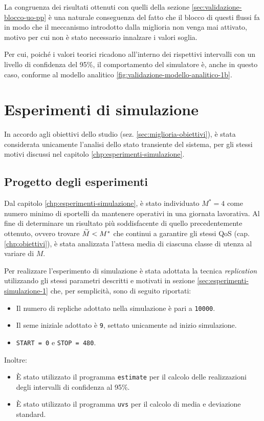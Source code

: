 La congruenza dei risultati ottenuti con quelli della sezione \ref{sec:validazione-blocco-uo-pp} è una naturale conseguenza del fatto che il blocco di questi flussi fa in modo che il meccanismo introdotto dalla miglioria non venga mai attivato, motivo per cui non è stato necessario innalzare i valori soglia.

Per cui, poiché i valori teorici ricadono all'interno dei rispettivi intervalli con un livello di confidenza del 95\%, il comportamento del simulatore è, anche in questo caso, conforme al modello analitico \ref{fig:validazione-modello-analitico-1b}.

\section{Esperimenti di simulazione}\label{sec:miglioria-esperimenti}
In accordo agli obiettivi dello studio (sez. \ref{sec:miglioria-obiettivi}), è stata considerata unicamente l'analisi dello stato transiente del sistema, per gli stessi motivi discussi nel capitolo \ref{chp:esperimenti-simulazione}.

\newpage
\subsection{Progetto degli esperimenti}
Dal capitolo \ref{chp:esperimenti-simulazione}, è stato individuato $M^* = 4$ come numero minimo di sportelli da mantenere operativi in una giornata lavorativa. Al fine di determinare un risultato più soddisfacente di quello precedentemente ottenuto, ovvero trovare $\accentset{\sim}{M} < M^*$ che continui a garantire gli stessi QoS (cap. \ref{chp:obiettivi}), è stata analizzata l'attesa media di ciascuna classe di utenza al variare di $M$.

Per realizzare l'esperimento di simulazione è stata adottata la tecnica \textit{replication} utilizzando gli stessi parametri descritti e motivati in sezione \ref{sec:esperimenti-simulazione-1} che, per semplicità, sono di seguito riportati:
\begin{itemize}
\item Il numero di repliche adottato nella simulazione è pari a \texttt{10000}.
\item Il seme iniziale adottato è \texttt{9}, settato unicamente ad inizio simulazione.
\item \texttt{START = 0} e \texttt{STOP = 480}.
\end{itemize}

Inoltre:
\begin{itemize}
\item È stato utilizzato il programma \texttt{estimate} per il calcolo delle realizzazioni degli intervalli di confidenza al 95\%.
\item È stato utilizzato il programma \texttt{uvs} per il calcolo di media e deviazione standard.
\end{itemize}

